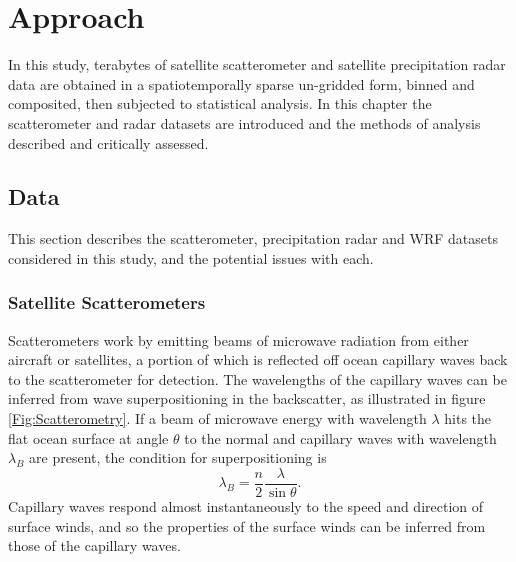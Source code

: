 \documentclass[12pt]{book}
\begin{document}
\chapter{Approach}
\label{Ch:Approach}
In this study, terabytes of satellite scatterometer and satellite precipitation radar data are obtained in a spatiotemporally sparse un-gridded form, binned and composited, then subjected to statistical analysis. In this chapter the scatterometer and radar datasets are introduced and the methods of analysis described and critically assessed.    

\section{Data}
This section describes the scatterometer, precipitation radar and WRF datasets considered in this study, and the potential issues with each.

\subsection{Satellite Scatterometers}
\label{Sec:Scatt}
Scatterometers work by emitting beams of microwave radiation from either aircraft or satellites, a portion of which is reflected off ocean capillary waves back to the scatterometer for detection. The wavelengths of the capillary waves can be inferred from wave superpositioning in the backscatter, as illustrated in figure \ref{Fig:Scatterometry}. If a beam of microwave energy with wavelength $\lambda$ hits the flat ocean surface at angle $\theta$ to the normal and capillary waves with wavelength $\lambda_B$ are present, the condition for superpositioning is \cite[]{stoffelen98}
\begin{equation}
\lambda_B=\frac{n}{2}\frac{\lambda}{\sin \theta}.
\end{equation}
Capillary waves respond almost instantaneously to the speed and direction of surface winds, and so the properties of the surface winds can be inferred from those of the capillary waves.
\end{document}
